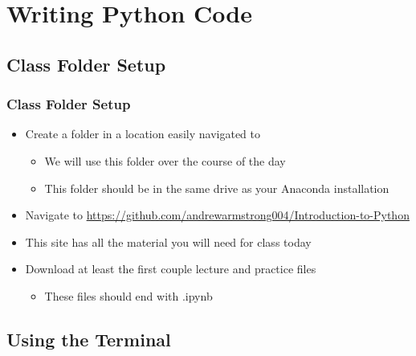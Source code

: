 \documentclass[mini frame in current subsection]{beamer}
\begin{document}
\section{Writing Python Code}

	\subsection{Class Folder Setup}
	
		\begin{frame}
			\frametitle{Class Folder Setup}
			
			\begin{itemize}
				\vfill\item  Create a folder in a location easily navigated to
					\begin{itemize}
						\item  We will use this folder over the course of the day
						\item  This folder should be in the same drive as your Anaconda installation
					\end{itemize}
				\vfill\item  Navigate to \url{https://github.com/andrewarmstrong004/Introduction-to-Python}
				\vfill\item  This site has all the material you will need for class today
				\vfill\item  Download at least the first couple lecture and practice files
					\begin{itemize}
						\item  These files should end with .ipynb
					\end{itemize}
			\end{itemize}
			
		\end{frame}
	\subsection{Using the Terminal}
	
\end{document}
